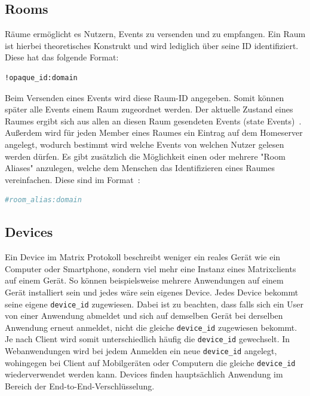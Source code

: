     \subsection{Rooms}\label{subsec:rooms}
    Räume ermöglicht es Nutzern, Events zu versenden und zu empfangen.
    Ein Raum ist hierbei theoretisches Konstrukt und wird lediglich über seine ID identifiziert.
    Diese hat das folgende Format:
    \begin{lstlisting}[language=bash,label={lst:roomid}]
        !opaque_id:domain
    \end{lstlisting}
    Beim Versenden eines Events wird diese Raum-ID angegeben.
    Somit können später alle Events einem Raum zugeordnet werden.
    Der aktuelle Zustand eines Raumes ergibt sich aus allen an diesen Raum gesendeten Events (state Events)~\cite{rooms}.
    Außerdem wird für jeden Member eines Raumes ein Eintrag auf dem Homeserver angelegt, wodurch bestimmt wird welche Events von welchen Nutzer gelesen werden dürfen.
    Es gibt zusätzlich die Möglichkeit einen oder mehrere "Room Aliases" anzulegen, welche dem Menschen das Identifizieren eines Raumes vereinfachen.
    Diese sind im Format~\cite{rooms}:
    \begin{lstlisting}[language=bash,label={lst:roomalias}]
        #room_alias:domain
    \end{lstlisting}



    \subsection{Devices}
    Ein Device im Matrix Protokoll beschreibt weniger ein reales Gerät wie ein Computer oder Smartphone, sondern viel mehr eine Instanz eines Matrixclients auf einem Gerät.
    So können beispielsweise mehrere Anwendungen auf einem Gerät installiert sein und jedes wäre sein eigenes Device.
    Jedes Device bekommt seine eigene \texttt{device\_id} zugewiesen.
    Dabei ist zu beachten, dass falls sich ein User von einer Anwendung abmeldet und sich auf demselben Gerät bei derselben Anwendung erneut anmeldet, nicht die gleiche \texttt{device\_id} zugewiesen bekommt.
    Je nach Client wird somit unterschiedlich häufig die \texttt{device\_id} gewechselt.
    In Webanwendungen wird bei jedem Anmelden ein neue \texttt{device\_id} angelegt, wohingegen bei Client auf Mobilgeräten oder Computern die gleiche \texttt{device\_id} wiederverwendet werden kann.
    Devices finden hauptsächlich Anwendung im Bereich der End-to-End-Verschlüsselung.

